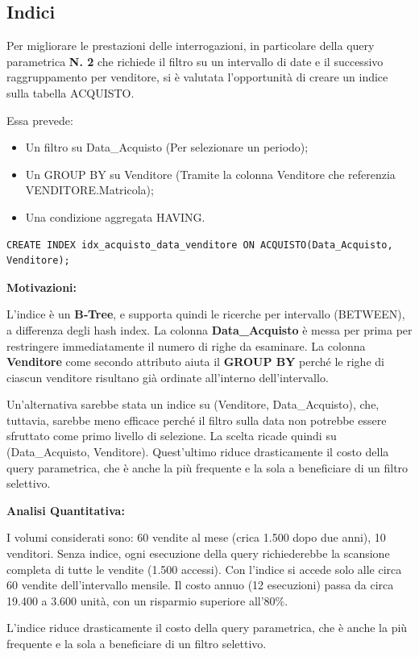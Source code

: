 \vspace{0.5cm}
\subsection{Indici}
Per migliorare le prestazioni delle interrogazioni, in particolare della query parametrica \textbf{N. 2} che richiede il filtro su un intervallo di date e il successivo raggruppamento per venditore, si è valutata l'opportunità di creare un indice sulla tabella ACQUISTO.

Essa prevede:
\begin{itemize}
    \item Un filtro su Data\_Acquisto (Per selezionare un periodo);
    \item Un GROUP BY su Venditore (Tramite la colonna Venditore che referenzia VENDITORE.Matricola);
    \item Una condizione aggregata HAVING.
\end{itemize}

\vspace{0.5cm}
\begin{lstlisting}[framesep=10pt]
CREATE INDEX idx_acquisto_data_venditore ON ACQUISTO(Data_Acquisto, Venditore);
\end{lstlisting}

\textbf{Motivazioni:}

L'indice è un \textbf{B‑Tree}, e supporta quindi le ricerche per intervallo (BETWEEN), a differenza degli hash index.
\newline La colonna \textbf{Data\_Acquisto} è messa per prima per restringere immediatamente il numero di righe da esaminare.
\newline La colonna \textbf{Venditore} come secondo attributo aiuta il \textbf{GROUP BY} perché le righe di ciascun venditore risultano già ordinate all'interno dell'intervallo.

Un'alternativa sarebbe stata un indice su (Venditore, Data\_Acquisto), che, tuttavia, sarebbe meno efficace perché il filtro sulla data non potrebbe essere sfruttato come primo livello di selezione. La scelta ricade quindi su (Data\_Acquisto, Venditore).
\newline Quest'ultimo riduce drasticamente il costo della query parametrica, che è anche la più frequente e la sola a beneficiare di un filtro selettivo.

\vspace{0.5cm}
\textbf{Analisi Quantitativa:}

I volumi considerati sono: 60 vendite al mese (crica 1.500 dopo due anni), 10 venditori. Senza indice, ogni esecuzione della query richiederebbe la scansione completa di tutte le vendite (1.500 accessi). Con l'indice si accede solo alle circa 60 vendite dell'intervallo mensile. Il costo annuo (12 esecuzioni) passa da circa 19.400 a 3.600 unità, con un risparmio superiore all’80\%.

L'indice riduce drasticamente il costo della query parametrica, che è anche la più frequente e la sola a beneficiare di un filtro selettivo.